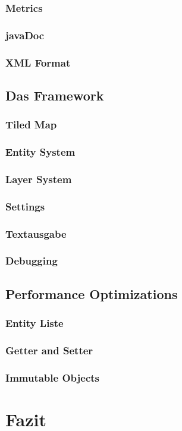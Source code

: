 		\subsubsection{Metrics}
		\subsubsection{javaDoc}
		\subsubsection{XML Format}
	\subsection{Das Framework}
		\subsubsection{Tiled Map}
		\subsubsection{Entity System}
		\subsubsection{Layer System}
		\subsubsection{Settings}
		\subsubsection{Textausgabe}
		\subsubsection{Debugging}
	\subsection{Performance Optimizations}
		\subsubsection{Entity Liste}
		\subsubsection{Getter and Setter}
		\subsubsection{Immutable Objects}
\section{Fazit}